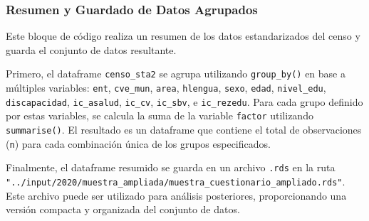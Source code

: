 \documentclass[
  12pt,
]{book}
\newenvironment{Shaded}{\begin{snugshade}}{\end{snugshade}}
\newcommand{\CommentTok}[1]{\textcolor[rgb]{0.56,0.35,0.01}{\textit{#1}}}
\newcommand{\FunctionTok}[1]{\textcolor[rgb]{0.13,0.29,0.53}{\textbf{#1}}}
\newcommand{\NormalTok}[1]{#1}
\newcommand{\SpecialCharTok}[1]{\textcolor[rgb]{0.81,0.36,0.00}{\textbf{#1}}}
\newcommand{\StringTok}[1]{\textcolor[rgb]{0.31,0.60,0.02}{#1}}
\begin{document}
\begin{Shaded}
\end{Shaded}

\hypertarget{resumen-y-guardado-de-datos-agrupados}{%
\subsubsection*{Resumen y Guardado de Datos Agrupados}\label{resumen-y-guardado-de-datos-agrupados}}

Este bloque de código realiza un resumen de los datos estandarizados del censo y guarda el conjunto de datos resultante.

Primero, el dataframe \texttt{censo\_sta2} se agrupa utilizando \texttt{group\_by()} en base a múltiples variables: \texttt{ent}, \texttt{cve\_mun}, \texttt{area}, \texttt{hlengua}, \texttt{sexo}, \texttt{edad}, \texttt{nivel\_edu}, \texttt{discapacidad}, \texttt{ic\_asalud}, \texttt{ic\_cv}, \texttt{ic\_sbv}, e \texttt{ic\_rezedu}. Para cada grupo definido por estas variables, se calcula la suma de la variable \texttt{factor} utilizando \texttt{summarise()}. El resultado es un dataframe que contiene el total de observaciones (\texttt{n}) para cada combinación única de los grupos especificados.

Finalmente, el dataframe resumido se guarda en un archivo \texttt{.rds} en la ruta \texttt{"../input/2020/muestra\_ampliada/muestra\_cuestionario\_ampliado.rds"}. Este archivo puede ser utilizado para análisis posteriores, proporcionando una versión compacta y organizada del conjunto de datos.
\end{document}
